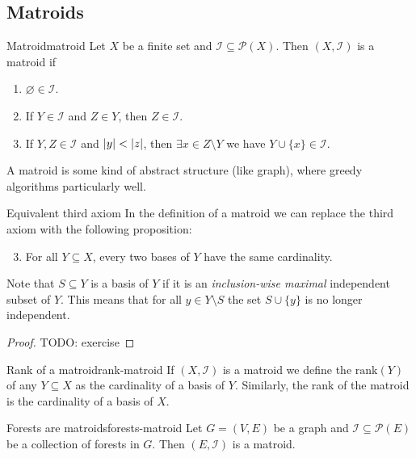 \documentclass[12pt]{extarticle}
\begin{document}
\subsection{Matroids}

\begin{definition}{Matroid}{matroid}
	Let $X$ be a finite set and $\mathcal I \subseteq \mathcal P(X)$.
	Then $(X, \mathcal I)$ is a matroid if
	\begin{enumerate}
		\item $\varnothing \in \mathcal I$.
		\item If $Y \in \mathcal I$ and $Z \in Y$, then $Z \in \mathcal I$.
		\item If $Y, Z \in \mathcal I$ and $\abs{y} < \abs{z}$, then $\exists x \in Z \setminus Y$ we
		      have $Y \cup \{x\} \in \mathcal I$.
	\end{enumerate}
\end{definition}

A matroid is some kind of abstract structure (like graph), where greedy algorithms 
particularly well.

\begin{lemma}{Equivalent third axiom}{}
	In the definition of a matroid we can replace the third axiom with the following proposition:
	\begin{enumerate}
		\setcounter{enumi}{2}
		\item For all $Y \subseteq X$, every two bases of $Y$ have the same cardinality.
	\end{enumerate}
\end{lemma}

Note that $S \subseteq Y$ is a basis of $Y$ if it is an \emph{inclusion-wise maximal} independent
subset of $Y$.
This means that for all $y \in Y \setminus S$ the set $S \cup \{y\}$ is no longer independent.

\begin{proof}
	TODO: exercise
\end{proof}

\begin{definition}{Rank of a matroid}{rank-matroid}
	If $(X, \mathcal I)$ is a matroid we define the $\mathrm{rank}(Y)$ of any $Y \subseteq X$ as the
	cardinality of a basis of $Y$. Similarly, the rank of the matroid is the cardinality of a basis
	of $X$.
\end{definition}

\begin{proposition}{Forests are matroids}{forests-matroid}
	Let $G=(V, E)$ be a graph and $\mathcal I \subseteq \mathcal P(E)$ be a collection of forests in
	$G$. Then $(E, \mathcal I)$ is a matroid.
\end{proposition}
\end{document}
